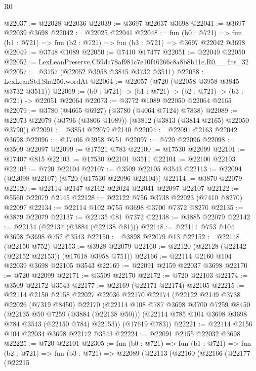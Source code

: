 \begin{lexlean}{R0}
\begin{coremodule}
@22037 := @22028 @22036
@22039 := @3697 @22037 @3698
@22041 := @3697 @22039 @3698
@22042 := @22025 @22041
@22048 := fun (b0 : @721) =>
  fun (b1 : @721) => fun (b2 : @721) => fun (b3 : @721) => @3697 @22042 @3698
@22049 := @3748 @1089
@22050 := @7410 @17477
@22051 := @22049 @22050
@22052 := LexLeanPreserve.C59da78af981c7e10f46266c8a8b8b11e.R0.__fits_32
@22057 := @3757 (@22052 @3958 @3845 @3732 @3511)
@22058 := LexLeanStd.Sha256.wordAt
@22064 := @22057 (@720 (@22058 @3958 @3845 @3732 @3511))
@22069 := (b0 : @721) -> (b1 : @721) -> (b2 : @721) -> (b3 : @721) -> @22051 @22064
@22073 := @3772 @1089 @22050 @22064 @2165
@22079 := @3780 (@4665 @6927) (@3780 (@4064 @7124) @7838)
@22089 := @22073 @22079 (@3796 (@3806 @1089)) (@3812 (@3813 (@3814 @2165) @22050 @3790))
@22091 := @3854 @22079 @2140
@22094 := @22091 @2163 @22042 @3698
@22096 := @17406 @3958 @751
@22097 := @720 @22096
@22098 := @3509 @22097
@22099 := @17521 @783
@22100 := @17530 @22099
@22101 := @17407 @815
@22103 := @17530 @22101 @3511
@22104 := @22100 @22103
@22105 := @720 @22104
@22107 := @3509 @22105 @3543
@22113 := @22094 (@22098 @22107) (@720 (@17530 @22096 @22104))
@22114 := @3870 @22079
@22120 := @22114 @2147 @2162 @22024 @22041 @22097 @22107
@22122 := @5560 @22079 @2145
@22128 := @22122 @756 @3738 @22023 (@7410 @8270) @22097
@22134 := @22114 @102 @755 @3698 @3700 @7372 @8270
@22135 := @3879 @22079
@22137 := @22135 @81 @7372
@22138 := @3885 @22079
@22142 := @22134 (@22137 (@3884 (@22138 @81)))
@22148 := @22114 @753 @104 @3698 @3698 @752 @3543
@22150 := @3898 @22079 @13
@22152 := @22148 (@22150 @752)
@22153 := @3928 @22079
@22160 := @22120 (@22128 (@22142 (@22152 @22153)) (@17618 @3958 @751))
@22166 := @22114 @2160 @104 @22039 @3698 @22105 @3543
@22169 := @22091 @2159 @22037 @3698
@22170 := @720 @22099
@22171 := @3509 @22170
@22172 := @720 @22103
@22174 := @3509 @22172 @3543
@22177 := @22169 (@22171 @22174) @22105
@22215 := @22114
    @2150
    @2158
    @22027
    @22036
    @22170
    @22174
    (@22122
      @2149
      @3738
      @22026
      (@7319 @8450)
      @22170
      (@22114
        @108
        @787
        @3698
        @3700
        @7259
        @8450
        (@22135 @50 @7259 (@3884 (@22138 @50)))
        (@22114 @785 @104 @3698 @3698 @784 @3543 (@22150 @784) @22153))
      (@17619 @783))
@22221 := @22114 @2156 @104 @22034 @3698 @22172 @3543
@22224 := @22091 @2155 @22032 @3698
@22225 := @720 @22101
@22305 := fun (b0 : @721) =>
  fun (b1 : @721) =>
  fun (b2 : @721) =>
  fun (b3 : @721) =>
  @22089
    (@22113
      (@22160
        (@22166
          (@22177
            (@22215

\end{coremodule}
\end{lexlean}
